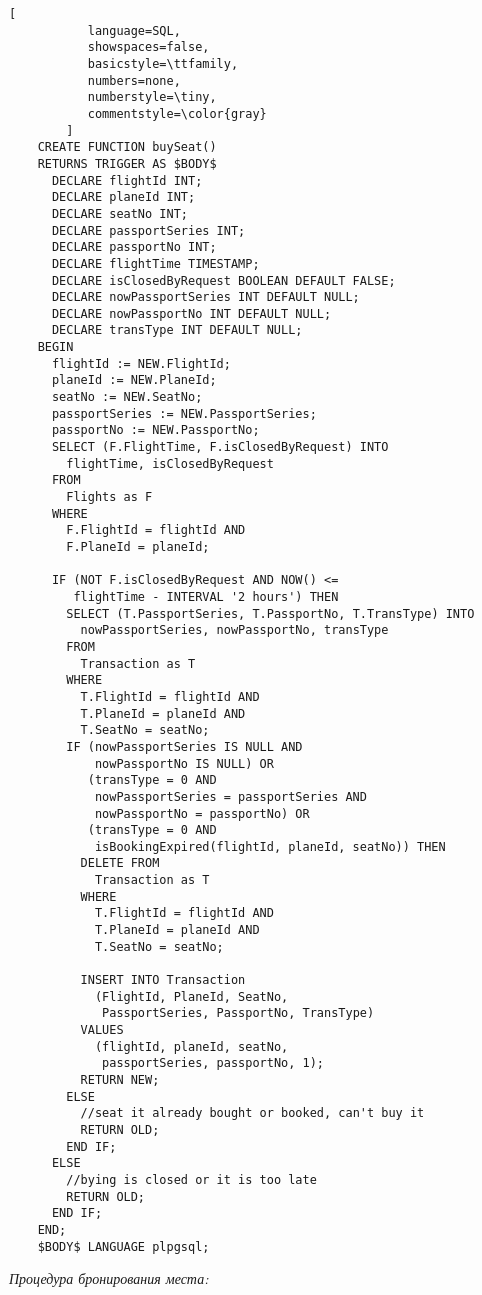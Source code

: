 \documentclass[11pt,a4paper,oneside]{article}
\begin{document}
\begin{lstlisting}[
           language=SQL,
           showspaces=false,
           basicstyle=\ttfamily,
           numbers=none,
           numberstyle=\tiny,
           commentstyle=\color{gray}
        ]
    CREATE FUNCTION buySeat()
    RETURNS TRIGGER AS $BODY$
      DECLARE flightId INT;
      DECLARE planeId INT;
      DECLARE seatNo INT;
      DECLARE passportSeries INT;
      DECLARE passportNo INT;
      DECLARE flightTime TIMESTAMP;
      DECLARE isClosedByRequest BOOLEAN DEFAULT FALSE;
      DECLARE nowPassportSeries INT DEFAULT NULL;
      DECLARE nowPassportNo INT DEFAULT NULL;
      DECLARE transType INT DEFAULT NULL;
    BEGIN
      flightId := NEW.FlightId;
      planeId := NEW.PlaneId;
      seatNo := NEW.SeatNo;
      passportSeries := NEW.PassportSeries;
      passportNo := NEW.PassportNo;
      SELECT (F.FlightTime, F.isClosedByRequest) INTO
        flightTime, isClosedByRequest
      FROM
        Flights as F
      WHERE
        F.FlightId = flightId AND
        F.PlaneId = planeId;

      IF (NOT F.isClosedByRequest AND NOW() <=
         flightTime - INTERVAL '2 hours') THEN
        SELECT (T.PassportSeries, T.PassportNo, T.TransType) INTO
          nowPassportSeries, nowPassportNo, transType
        FROM
          Transaction as T
        WHERE
          T.FlightId = flightId AND
          T.PlaneId = planeId AND
          T.SeatNo = seatNo;
        IF (nowPassportSeries IS NULL AND 
            nowPassportNo IS NULL) OR
           (transType = 0 AND
            nowPassportSeries = passportSeries AND
            nowPassportNo = passportNo) OR
           (transType = 0 AND
            isBookingExpired(flightId, planeId, seatNo)) THEN
          DELETE FROM
            Transaction as T
          WHERE
            T.FlightId = flightId AND
            T.PlaneId = planeId AND
            T.SeatNo = seatNo;

          INSERT INTO Transaction
            (FlightId, PlaneId, SeatNo,
             PassportSeries, PassportNo, TransType)
          VALUES
            (flightId, planeId, seatNo,
             passportSeries, passportNo, 1);
          RETURN NEW;
        ELSE
          //seat it already bought or booked, can't buy it
          RETURN OLD;
        END IF;
      ELSE
        //bying is closed or it is too late
        RETURN OLD;
      END IF;
    END;
    $BODY$ LANGUAGE plpgsql;
\end{lstlisting}

\textit{Процедура бронирования места:}
\end{document}
